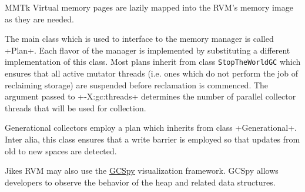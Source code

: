 \begin{chapter}{MMTk}
Virtual memory pages are lazily mapped into the RVM's memory image as they are needed.

The main class which is used to interface to the memory manager is called \spverb+Plan+. Each flavor of the manager is implemented by substituting a different implementation of this class. Most plans inherit from class \texttt{Stop\-The\-World\-GC} which ensures that all active mutator threads (i.e. ones which do not perform the job of reclaiming storage) are suspended before reclamation is commenced. The argument passed to \spverb+-X:gc:threads+ determines the number of parallel collector threads that will be used for collection.

Generational collectors employ a plan which inherits from class \spverb+Generational+. Inter alia, this class ensures that a write barrier is employed so that updates from old to new spaces are detected.

Jikes RVM may also use the \hyperref[sec:usinggcspy]{GCSpy} visualization framework. GCSpy allows developers to observe the behavior of the heap and related data structures.










\end{chapter}
